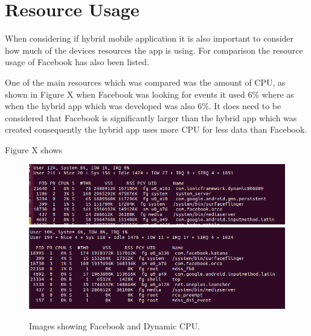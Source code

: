  \section{Resource Usage}
 When considering if hybrid mobile application it is also important to consider how much of the devices resources the app is using. For comparison the resource usage of Facebook has also been listed.

 One of the main resources which was compared was the amount of CPU, as shown in Figure X when Facebook was looking for events it used 6\% where as when the hybrid app which was developed was also 6\%. It does need to be considered that Facebook is significantly larger than the hybrid app which was created consequently the hybrid app uses more CPU for less data than Facebook.

 Figure X shows 

\begin{figure}[H]
\includegraphics[scale=0.45]{images/ram2}
\includegraphics[scale=0.45]{images/ram3}
\caption{Images showing Facebook and Dynamic CPU.}
\end{figure}
